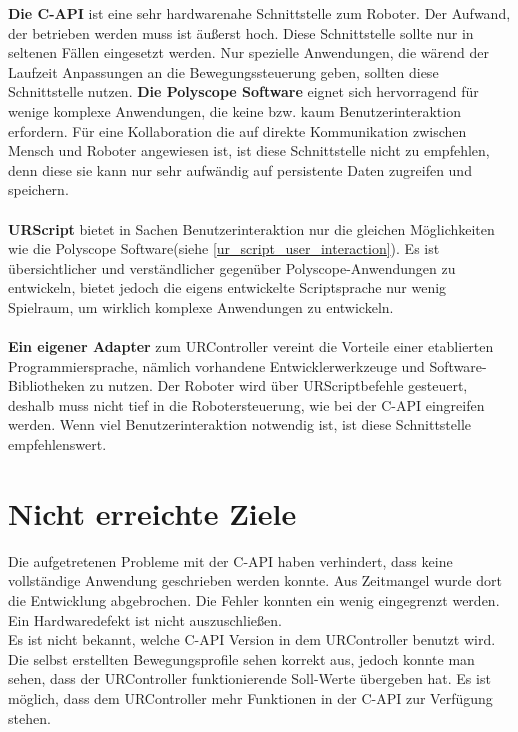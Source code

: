 \textbf{Die C-API} ist eine sehr hardwarenahe Schnittstelle zum Roboter. Der Aufwand, der betrieben werden muss ist äußerst hoch. Diese Schnittstelle sollte nur in seltenen Fällen eingesetzt werden. Nur spezielle Anwendungen, die wärend der Laufzeit Anpassungen an die Bewegungssteuerung geben, sollten diese Schnittstelle nutzen.
\newpage
\textbf{Die Polyscope Software} eignet sich hervorragend für wenige komplexe Anwendungen, die keine bzw. kaum Benutzerinteraktion erfordern. Für eine Kollaboration die auf direkte Kommunikation zwischen Mensch und Roboter angewiesen ist, ist diese Schnittstelle nicht zu empfehlen, denn diese sie kann nur sehr aufwändig auf persistente Daten zugreifen und speichern.
\\\\
\textbf{URScript} bietet in Sachen Benutzerinteraktion nur die gleichen Möglichkeiten wie die Polyscope Software(siehe \ref{ur_script_user_interaction}). Es ist übersichtlicher und verständlicher gegenüber Polyscope-Anwendungen zu entwickeln, bietet jedoch die eigens entwickelte Scriptsprache nur wenig Spielraum, um wirklich komplexe Anwendungen zu entwickeln.
\\\\
\textbf{Ein eigener Adapter} zum URController vereint die Vorteile einer etablierten Programmiersprache, nämlich vorhandene Entwicklerwerkzeuge und Software-Bibliotheken zu nutzen. Der Roboter wird über URScriptbefehle gesteuert, deshalb muss nicht tief in die Robotersteuerung, wie bei der C-API eingreifen werden. Wenn viel Benutzerinteraktion notwendig ist, ist diese Schnittstelle empfehlenswert.

\section{Nicht erreichte Ziele}
\label{sec:Nicht_erreichte_ziele}

Die aufgetretenen Probleme mit der C-API haben verhindert, dass keine vollständige Anwendung geschrieben werden konnte. Aus Zeitmangel wurde dort die Entwicklung abgebrochen. 
Die Fehler konnten ein wenig eingegrenzt werden. Ein Hardwaredefekt ist nicht auszuschließen. 
\\
Es ist nicht bekannt, welche C-API Version in dem URController benutzt wird. Die selbst erstellten Bewegungsprofile sehen korrekt aus, jedoch konnte man sehen, dass der URController funktionierende Soll-Werte übergeben hat. Es ist möglich, dass dem URController mehr Funktionen in der C-API zur Verfügung stehen.